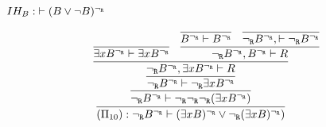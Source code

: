 \begin{enumerate}[(i)]
\begin{itemize}
            $IH_B : \; \vdash (B \vee \neg B)^{\neg_{\texttt{R}}}$
            
            $$
            \infer {
                                (\Pi_{10}) : \ngr B^\ngr \vdash (\exists x B)^\ngr \vee \ngr (\exists x B)^\ngr)
                            }{
                                \infer {
                                    \ngr B^\ngr \vdash \ngr\ngr\ngr(\exists x B^\ngr)
                                }{
                                   \infer {
                                       \ngr B^\ngr \vdash \ngr \exists x B^\ngr
                                    }{
                                        \infer {
                                           \ngr B^\ngr, \exists x B^\ngr \vdash R
                                        }{
                                            \infer {
                                               \exists x B^\ngr \vdash \exists x B^\ngr
                                            }{
                                            }
                                            &
                                            \infer {
                                               \ngr B^\ngr, B^\ngr \vdash R
                                            }{
                                                \infer {
                                                   B^\ngr \vdash B^\ngr
                                                }{
                                                }
                                                &
                                                \infer {
                                                   \ngr B^\ngr, \vdash \ngr B^\ngr
                                                }{
                                                }
                                            }
                                        }
                                    }
                                }
                            }
            $$
        

\end{itemize}
\end{enumerate}
